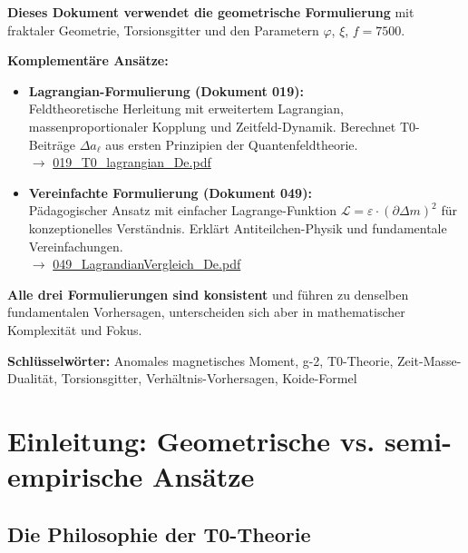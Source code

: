 	\begin{tcolorbox}[colback=blue!10!white, colframe=blue!75!black, title=Alternative Formulierungen der T0-Theorie]
		\textbf{Dieses Dokument verwendet die geometrische Formulierung} mit fraktaler Geometrie, Torsionsgitter und den Parametern $\varphi$, $\xi$, $f = 7500$.
		
		\textbf{Komplementäre Ansätze:}
		\begin{itemize}
			\item \textbf{Lagrangian-Formulierung (Dokument 019):} \\
			Feldtheoretische Herleitung mit erweitertem Lagrangian, massenproportionaler Kopplung und Zeitfeld-Dynamik. Berechnet T0-Beiträge $\Delta a_\ell$ aus ersten Prinzipien der Quantenfeldtheorie. \\
			$\rightarrow$ \href{https://github.com/jpascher/T0-Time-Mass-Duality/blob/main/2/pdf/019_T0_lagrangian_De.pdf}{019\_T0\_lagrangian\_De.pdf}
			
			\item \textbf{Vereinfachte Formulierung (Dokument 049):} \\
			Pädagogischer Ansatz mit einfacher Lagrange-Funktion $\mathcal{L} = \varepsilon \cdot (\partial \Delta m)^2$ für konzeptionelles Verständnis. Erklärt Antiteilchen-Physik und fundamentale Vereinfachungen. \\
			$\rightarrow$ \href{https://github.com/jpascher/T0-Time-Mass-Duality/blob/main/2/pdf/049_LagrandianVergleich_De.pdf}{049\_LagrandianVergleich\_De.pdf}
		\end{itemize}
		
		\textbf{Alle drei Formulierungen sind konsistent} und führen zu denselben fundamentalen Vorhersagen, unterscheiden sich aber in mathematischer Komplexität und Fokus.
	\end{tcolorbox}
	
	\textbf{Schlüsselwörter:} Anomales magnetisches Moment, g-2, T0-Theorie, Zeit-Masse-Dualität, Torsionsgitter, Verhältnis-Vorhersagen, Koide-Formel
	
	
	\section{Einleitung: Geometrische vs. semi-empirische Ansätze}
	
	\subsection{Die Philosophie der T0-Theorie}
	

